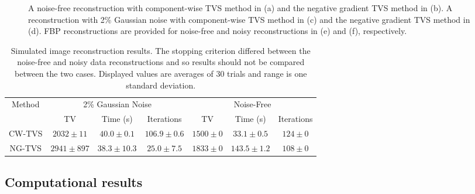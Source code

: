 \documentclass[smallextended]{svjour3}      %
\begin{document}
\begin{figure}
	\centering
	\def\wid{2in}
	\hspace{0.25in}
	
	\hspace{0.25in}
	
	\hspace{0.25in}
		
	\caption{A noise-free reconstruction with component-wise TVS method in (a) and the negative gradient TVS method in (b). A reconstruction with 2\% Gaussian noise with component-wise TVS method in (c) and the negative gradient TVS method in (d). FBP reconstructions are provided for noise-free and noisy reconstructions in (e) and (f), respectively. \label{fig: ART-TVS}}
\end{figure}


\begin{table}
	\caption{Simulated image reconstruction results. The stopping criterion differed between the noise-free and noisy data reconstructions and so results should not be compared between the two cases. Displayed values are averages of 30 trials and range is one standard deviation.\label{table: Results} }	
	\centering
	\renewcommand{\arraystretch}{1.5}
	\begin{tabular}{c|ccc|ccc}
		\multirow{2}{*}{Method} & \multicolumn{3}{c}{2\% Gaussian Noise} & \multicolumn{3}{c}{Noise-Free} 	 	
		\\ \cline{2-7} \
		& TV  & Time (s)  & Iterations & TV & {Time (s) } & Iterations  \\
		\hline
		CW-TVS & {$2032\pm11$} & {$40.0\pm0.1$} & {$106.9\pm0.6$} & {$1500\pm0$} & {$33.1\pm0.5$} & {$124\pm0$} \\
		\hline  %
		NG-TVS &{$2941\pm897$} & {$38.3\pm10.3$} & {$25.0\pm7.5$} & {$1833\pm0$ } & {$143.5\pm1.2$ } & {$108\pm0$}
	\end{tabular}
\end{table}

\subsection{Computational results}
\end{document}
